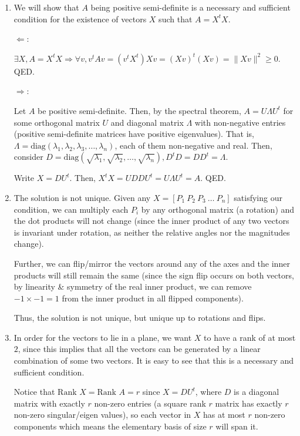 \documentclass[12pt]{article}
\newenvironment*{qparts}{\begin{enumerate}[label=(\alph*)]}{\end{enumerate}}
\begin{document}
\begin{qparts}
	\item We will show that $A$ being positive semi-definite is a necessary and sufficient condition for the existence of vectors $X$ such that $A = X^tX$.\bigskip
	
	$\Leftarrow$:

	$\exists X, A = X^tX \Rightarrow \forall v, v^tAv = (v^tX^t)Xv = (Xv)^t(Xv) = \lVert Xv \rVert^2 \geq 0$. QED.\bigskip

	$\Rightarrow$:

	Let $A$ be positive semi-definite. Then, by the spectral theorem, $A = U\Lambda U^t$ for some orthogonal matrix $U$ and diagonal matrix $\Lambda$ with non-negative entries (positive semi-definite matrices have positive eigenvalues). That is, $\Lambda = \text{diag}(\lambda_1, \lambda_2, \lambda_3, \dots, \lambda_n)$, each of them non-negative and real. Then, consider $D = \text{diag}(\sqrt{\lambda_1}, \sqrt{\lambda_2}, \dots, \sqrt{\lambda_n}), D^tD = DD^t = \Lambda$. \medskip

	Write $X = DU^t$. Then, $X^tX = UDDU^t = U\Lambda U^t = A$. QED.

	\item The solution is not unique. Given any $X = [P_1\ P_2\ P_3\ \dots\ P_n]$ satisfying our condition, we can multiply each $P_i$ by any orthogonal matrix (a rotation) and the dot products will not change (since the inner product of any two vectors is invariant under rotation, as neither the relative angles nor the magnitudes change).\medskip
	
	Further, we can flip/mirror the vectors around any of the axes and the inner  products will still remain the same (since the sign flip occurs on both vectors, by linearity \& symmetry of the real inner product, we can remove $-1 \times -1 = 1$ from the inner product in all flipped components).\medskip

	Thus, the solution is not unique, but unique up to rotations and flips.

	\item In order for the vectors to lie in a plane, we want $X$ to have a rank of at most $2$, since this implies that all the vectors can be generated by a linear combination of some two vectors. It is easy to see that this is a necessary and sufficient condition.\medskip
	
	Notice that $\text{Rank } X = \text{Rank } A = r$ since $X = DU^t$, where $D$ is a diagonal matrix with exactly $r$ non-zero entries (a square rank $r$ matrix has exactly $r$ non-zero singular/eigen values), so each vector in $X$ has at most $r$ non-zero components which means the elementary basis of size $r$ will span it.\medskip


\end{qparts}
\end{document}
